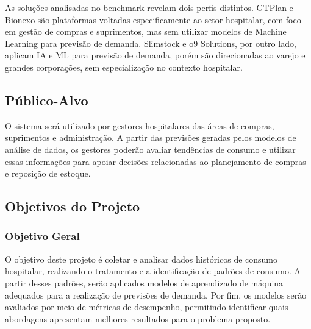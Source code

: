\documentclass[12pt,a4paper]{article}
\begin{document}
As soluções analisadas no benchmark revelam dois perfis distintos. GTPlan e Bionexo são plataformas voltadas especificamente ao setor hospitalar, com foco em gestão de compras e suprimentos, mas sem utilizar modelos de Machine Learning para previsão de demanda. Slimstock e o9 Solutions, por outro lado, aplicam IA e ML para previsão de demanda, porém são direcionadas ao varejo e grandes corporações, sem especialização no contexto hospitalar.



\subsection{Público-Alvo}

O sistema será utilizado por gestores hospitalares das áreas de compras, suprimentos e administração. A partir das previsões geradas pelos modelos de análise de dados, os gestores poderão avaliar tendências de consumo e utilizar essas informações para apoiar decisões relacionadas ao planejamento de compras e reposição de estoque.

\subsection{Objetivos do Projeto}

\subsubsection{Objetivo Geral}

O objetivo deste projeto é coletar e analisar dados históricos de consumo hospitalar, realizando o tratamento e a identificação de padrões de consumo. A partir desses padrões, serão aplicados modelos de aprendizado de máquina adequados para a realização de previsões de demanda. Por fim, os modelos serão avaliados por meio de métricas de desempenho, permitindo identificar quais abordagens apresentam melhores resultados para o problema proposto.
\end{document}
